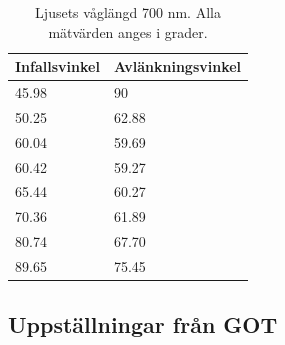 \documentclass[a4paper]{article}
\begin{document}
\begin{table}[h]
    \begin{tabular}{|l|l|}
    \hline
    Infallsvinkel & Avlänkningsvinkel \\ \hline
    45.98         & 90                \\ \hline
    50.25         & 62.88             \\ \hline
    60.04         & 59.69             \\ \hline
    60.42         & 59.27             \\ \hline
    65.44         & 60.27             \\ \hline
    70.36         & 61.89             \\ \hline
    80.74         & 67.70             \\ \hline
    89.65         & 75.45             \\ \hline
    \end{tabular}
    \caption{Ljusets våglängd 700 nm. Alla mätvärden anges i grader.}
    \label{tb:700}
\end{table}
\pagebreak
\subsection{Uppställningar från GOT}
\end{document}
